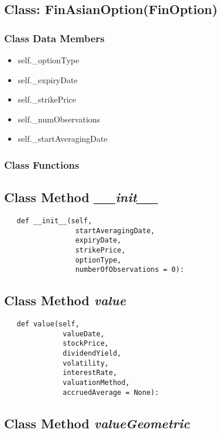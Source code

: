 \documentclass[twoside,11pt]{book}
\begin{document}
\subsection{Class: FinAsianOption(FinOption)}


\subsubsection{Class Data Members}
\begin{itemize}
\item{self.\_optionType}
\item{self.\_expiryDate}
\item{self.\_strikePrice}
\item{self.\_numObservations}
\item{self.\_startAveragingDate}
\end{itemize}

\subsubsection{Class Functions}

\subsection{Class Method {\it \_\_init\_\_}}


\begin{lstlisting}
   def __init__(self,
                 startAveragingDate,
                 expiryDate,
                 strikePrice,
                 optionType,
                 numberOfObservations = 0):
\end{lstlisting}

\subsection{Class Method {\it value}}


\begin{lstlisting}
   def value(self,
              valueDate,
              stockPrice,
              dividendYield,
              volatility,
              interestRate,
              valuationMethod,
              accruedAverage = None):
\end{lstlisting}

\subsection{Class Method {\it valueGeometric}}
\end{document}

